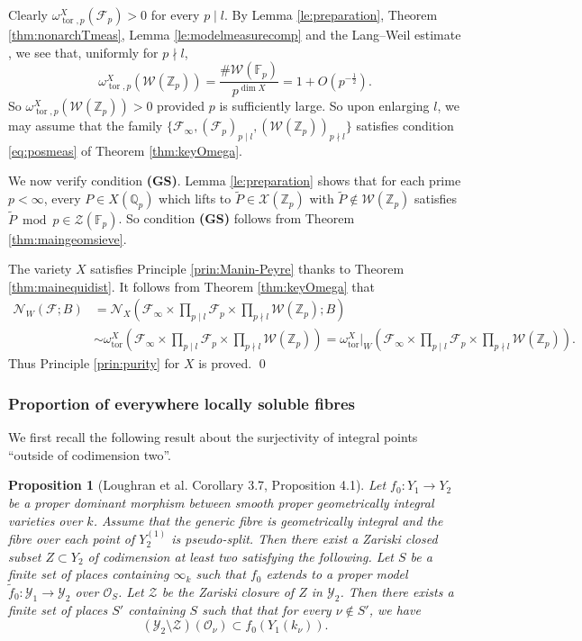 \documentclass[11pt,letterpaper]{amsart}
\newcommand{\BF}{{\mathbb {F}}}
\newcommand{\BQ}{{\mathbb {Q}}}
\newcommand{\BZ}{{\mathbb {Z}}}
\newcommand{\CF}{{\mathcal {F}}}
\newcommand{\CN}{{\mathcal {N}}}
\newcommand{\CO}{{\mathcal {O}}}
\newcommand{\CW}{{\mathcal {W}}}
\newcommand{\CX}{{\mathcal {X}}}
\newcommand{\CY}{{\mathcal {Y}}}
\newcommand{\CZ}{{\mathcal {Z}}}
\theoremstyle{plain}
\numberwithin{equation}{section}
\newtheorem{proposition}[theorem]{Proposition}
\theoremstyle{definition}
\theoremstyle{remark}
\begin{document}
Clearly $\omega_{\operatorname{tor},p}^X(\CF_p)>0$ for every $p\mid l$. By Lemma \ref{le:preparation}, Theorem \ref{thm:nonarchTmeas}, Lemma \ref{le:modelmeasurecomp} and the Lang--Weil estimate \cite{Lang-Weil}, we see that, uniformly for $p\nmid l$,  $$\omega_{\operatorname{tor},p}^X(\CW(\BZ_p))=\frac{\#\CW(\BF_p)}{p^{\dim X}}=1+O\left(p^{-\frac{1}{2}}\right).$$ So $\omega_{\operatorname{tor},p}^X(\CW(\BZ_p))>0$ provided $p$ is sufficiently large.  So upon enlarging $l$,  we may assume that the family $\{\CF_\infty,(\CF_p)_{p\mid l},(\CW(\BZ_{p}))_{p\nmid l}\}$ satisfies condition \eqref{eq:posmeas} of Theorem \ref{thm:keyOmega}.

We now verify condition \textbf{(GS)}.
Lemma \ref{le:preparation} shows that for each prime $p<\infty$, every $P\in X(\BQ_p)$ which lifts to $\widetilde{P}\in \CX(\BZ_p)$ with $\widetilde{P}\not\in \CW(\BZ_p)$ satisfies $\widetilde{P}\bmod p\in\CZ(\BF_p)$. So condition \textbf{(GS)} follows from Theorem \ref{thm:maingeomsieve}. 

The variety $X$ satisfies Principle \ref{prin:Manin-Peyre} thanks to Theorem \ref{thm:mainequidist}. It follows from Theorem \ref{thm:keyOmega} that 
\begin{equation}\label{eq:CNWB}
\begin{split}
	\CN_W(\CF;B)&=\CN_X\left(\CF_\infty\times\prod_{p\mid l}\CF_p\times \prod_{p\nmid l} \CW(\BZ_p);B\right)\\&\sim \omega^X_{\operatorname{tor}}\left(\CF_\infty\times\prod_{p\mid l}\CF_p\times \prod_{p\nmid l} \CW(\BZ_p)\right)=\omega_{\operatorname{tor}}^X|_W\left(\CF_\infty\times\prod_{p\mid l}\CF_p\times \prod_{p\nmid l} \CW(\BZ_p)\right).
\end{split}\end{equation}
Thus Principle \ref{prin:purity} for $X$ is proved.
\qed


\subsubsection{Proportion of everywhere locally soluble fibres}
We first recall the following result about the surjectivity of integral points ``outside of codimension two''.
\begin{proposition}[Loughran et al. \cite{BBL} Corollary 3.7, \cite{Loughran-Smeets} Proposition 4.1]\label{prop:surjectivity}
	Let $f_0:Y_1\to Y_2$ be a proper dominant morphism between smooth proper geometrically integral varieties over $k$.  Assume that the generic fibre is geometrically integral and the fibre over each point of $Y_2^{(1)}$ is pseudo-split. Then there exist a Zariski closed subset $Z\subset Y_2$ of codimension at least two satisfying the following. Let $S$ be a finite set of places containing $\infty_k$ such that $f_0$ extends to a proper model $\widetilde{f}_0:\CY_1\to\CY_2$ over $\CO_S$. Let $\CZ$ be the Zariski closure of $Z$ in $\CY_2$. Then there exists a finite set of places $S'$ containing $S$ such that  that for every $\nu\not\in S'$, we have 
	\begin{equation}\label{eq:surj}
		\left(\CY_2\setminus\CZ\right)(\CO_\nu)\subset f_0(Y_1(k_\nu)).
	\end{equation}
\end{proposition}
\end{document}
